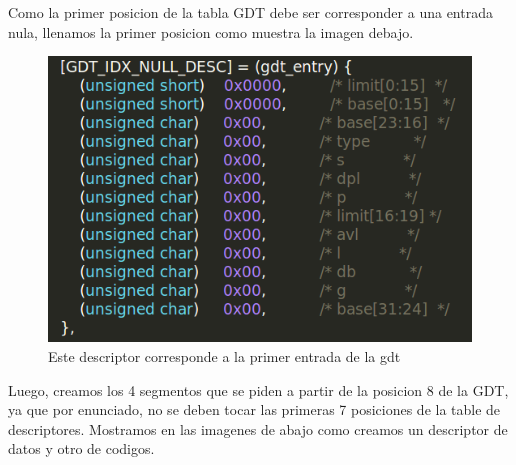 Como la primer posicion de la tabla GDT debe ser corresponder a una entrada nula, llenamos la primer posicion como muestra la imagen debajo.
\\

\begin{figure}[H]
\begin{center}
  \includegraphics[width=\linewidth]{ejercicio1/GDTnula.png}
  \caption{{\small Este descriptor corresponde a la primer entrada de la gdt}} 
\endminipage
\end{center}
\end{figure}

Luego, creamos los 4 segmentos que se piden a partir de la posicion 8 de la GDT, ya que por enunciado, no se deben tocar las primeras 7 posiciones de la table de descriptores. Mostramos en las imagenes de abajo como creamos un descriptor de datos y otro de codigos. 
\\

